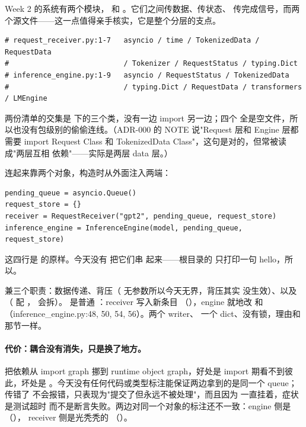 Week 2 的系统有两个模块， 和 。它们之间传数据、传状态、
传完成信号，而两个源文件——这一点值得亲手核实，它是整个分层的支点。

\begin{lstlisting}[style=hlplain]
# request_receiver.py:1-7   asyncio / time / TokenizedData / RequestData
#                           / Tokenizer / RequestStatus / typing.Dict
# inference_engine.py:1-9   asyncio / RequestStatus / TokenizedData
#                           / typing.Dict / RequestData / transformers / LMEngine
\end{lstlisting}

两份清单的交集是  下的三个类，没有一边 import 另一边；四个
 全是空文件，所以也没有包级别的偷偷连线。（ADR-000 的 NOTE 说"Request 层和
Engine 层都需要 import Request Class 和 TokenizedData Class"，这句是对的，但常被读成"两层互相
依赖"——实际是两层 data 层。）

连起来靠两个对象，构造时从外面注入两端：

\begin{lstlisting}[style=hlplain]
pending_queue = asyncio.Queue()
request_store = {}
receiver = RequestReceiver("gpt2", pending_queue, request_store)
inference_engine = InferenceEngine(model, pending_queue, request_store)
\end{lstlisting}

这四行是  的原样。今天没有  把它们串
起来——根目录的  只打印一句 hello，所以。

 兼三个职责：数据传递、背压（ 无参数所以今天无界，背压其实
没生效）、以及（ 配 ， 会拆）。
 是普通 ：receiver 写入新条目
（），engine 就地改
 和 （inference\_engine.py:48, 50, 54, 56）。两个 writer、
一个 dict、没有锁，理由和  那节一样。

\paragraph{代价：耦合没有消失，只是换了地方。}
把依赖从 import graph 挪到 runtime object graph，好处是 import 期看不到彼此，坏处是
。今天没有任何代码或类型标注能保证两边拿到的是同一个 queue；传错了
不会报错，只表现为"提交了但永远不被处理"，而且因为  一直挂着，症状是测试超时
而不是断言失败。两边对同一个对象的标注还不一致：engine 侧是
（），
receiver 侧是光秃秃的 
（）。


